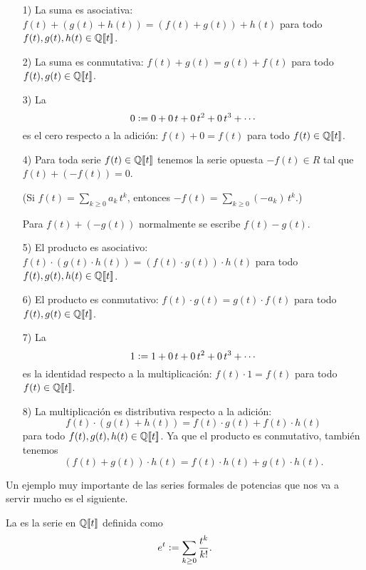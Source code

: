 \documentclass{article}
\begin{document}
\begin{enumerate}
\item[1)] La suma es asociativa: $f(t)+(g(t)+h(t)) = (f(t)+g(t))+h(t)$ para todo $f(t),g(t),h(t)\in \mathbb{Q}[\![t]\!]$.

\item[2)] La suma es conmutativa: $f(t)+g(t) = g(t)+f(t)$ para todo $f(t),g(t)\in \mathbb{Q}[\![t]\!]$.

\item[3)] La 
$$0 \mathrel{\mathop:}= 0 + 0\,t + 0\,t^2 + 0\,t^3 + \cdots$$
es el cero respecto a la adición: $f (t) + 0 = f (t)$ para todo $f (t) \in \mathbb{Q} [\![t]\!]$.

\item[4)] Para toda serie $f(t)\in \mathbb{Q}[\![t]\!]$ tenemos la serie opuesta $-f(t)\in R$ tal que $f(t) + (-f(t)) = 0$.

(Si $f (t) = \sum_{k\ge 0} a_k\,t^k$, entonces $-f (t) = \sum_{k \ge 0} (-a_k)\,t^k$.)

Para $f (t) + (-g(t))$ normalmente se escribe $f(t)-g(t)$.

\item[5)] El producto es asociativo: $f(t)\cdot (g(t)\cdot h(t)) = (f(t)\cdot g(t))\cdot h(t)$ para todo $f(t),g(t),h(t)\in \mathbb{Q}[\![t]\!]$.

\item[6)] El producto es conmutativo: $f(t)\cdot g(t) = g(t)\cdot f(t)$ para todo $f(t),g(t)\in \mathbb{Q}[\![t]\!]$.

\item[7)] La 
$$1 \mathrel{\mathop:}= 1 + 0\,t + 0\,t^2 + 0\,t^3 + \cdots$$
es la identidad respecto a la multiplicación: $f (t) \cdot 1 = f (t)$ para todo $f (t) \in \mathbb{Q} [\![t]\!]$.

\item[8)] La multiplicación es distributiva respecto a la adición:
$$f(t)\cdot (g(t)+h(t)) = f(t)\cdot g(t) + f(t)\cdot h(t)$$
para todo $f(t), g(t), h(t) \in \mathbb{Q} [\![t]\!]$. Ya que el producto es conmutativo, también tenemos
$$(f(t)+g(t))\cdot h(t) = f(t)\cdot h(t) + g(t)\cdot h(t).$$
\end{enumerate}

\pagebreak

Un ejemplo muy importante de las series formales de potencias que nos va a servir mucho es el siguiente.

\begin{definicion*}
La  es la serie en $\mathbb{Q} [\![t]\!]$ definida como
$$e^t \mathrel{\mathop:}= \sum_{k \ge 0} \frac{t^k}{k!}.$$
\end{definicion*}
\end{document}
